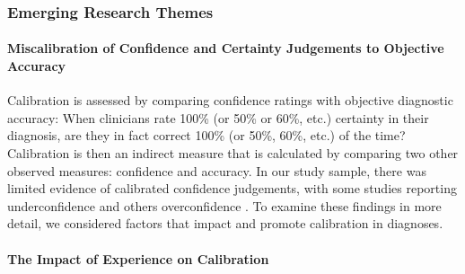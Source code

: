 \documentclass[a4paper, nobind]{templates/ociamthesis}
\begin{document}
\subsubsection*{Emerging Research Themes}\label{emerging-research-themes}

\paragraph*{Miscalibration of Confidence and Certainty Judgements to Objective Accuracy}\label{miscalibration-of-confidence-and-certainty-judgements-to-objective-accuracy}

Calibration is assessed by comparing confidence ratings with objective diagnostic accuracy: When clinicians rate 100\% (or 50\% or 60\%, etc.) certainty in their diagnosis, are they in fact correct 100\% (or 50\%, 60\%, etc.) of the time? Calibration is then an indirect measure that is calculated by comparing two other observed measures: confidence and accuracy. In our study sample, there was limited evidence of calibrated confidence judgements, with some studies reporting underconfidence \autocite{mann_relationship_1993,yang_effect_2012,brezis_does_2019}and others overconfidence \autocite{friedman_are_2001,fernandez-aguilar_use_2022,garbayo_metacognitive_2023}. To examine these findings in more detail, we considered factors that impact and promote calibration in diagnoses.

\paragraph*{The Impact of Experience on Calibration}\label{the-impact-of-experience-on-calibration}
\end{document}
